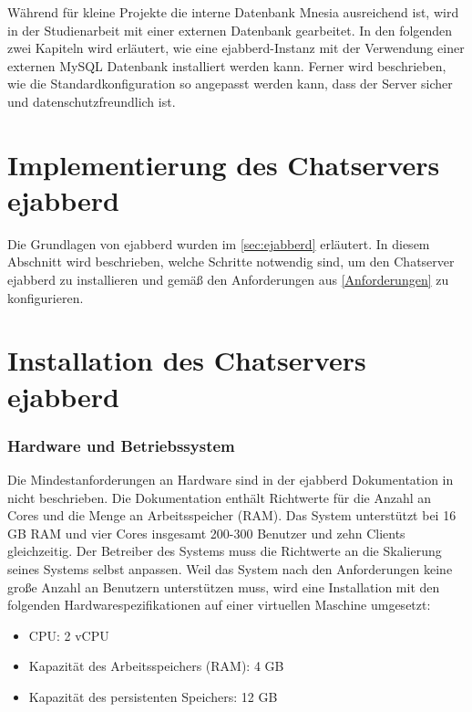 \documentclass[a4paper,titlepage,halfparskip,12pt]{scrreprt}
\begin{document}
\begin{onehalfspacing}
Während für kleine Projekte die interne Datenbank Mnesia ausreichend ist, wird in der Studienarbeit mit einer externen Datenbank gearbeitet. In den folgenden zwei Kapiteln wird erläutert, wie eine ejabberd-Instanz mit der Verwendung einer externen MySQL Datenbank installiert werden kann. Ferner wird beschrieben, wie die Standardkonfiguration so angepasst werden kann, dass der Server sicher und datenschutzfreundlich ist.

\pagebreak

\section{Implementierung des Chatservers ejabberd}
\label{sec:ChatserverEntwicklung}

Die Grundlagen von ejabberd wurden im \autoref{sec:ejabberd} erläutert. In diesem Abschnitt wird beschrieben, welche Schritte notwendig sind, um den Chatserver ejabberd zu installieren und gemäß den Anforderungen aus \autoref{Anforderungen} zu konfigurieren.

\section{Installation des Chatservers ejabberd}
\label{sec:InstallationEjabberd}

\subsubsection*{Hardware und Betriebssystem}

Die Mindestanforderungen an Hardware sind in der ejabberd Dokumentation in \cite{ejabberdDocGettingStarted} nicht beschrieben. Die Dokumentation enthält Richtwerte für die Anzahl an Cores und die Menge an Arbeitsspeicher (RAM). Das System unterstützt bei 16 GB RAM und vier Cores insgesamt 200-300 Benutzer und zehn Clients gleichzeitig. Der Betreiber des Systems muss die Richtwerte an die Skalierung seines Systems selbst anpassen. Weil das System nach den Anforderungen keine große Anzahl an Benutzern unterstützen muss, wird eine Installation mit den folgenden Hardwarespezifikationen auf einer virtuellen Maschine umgesetzt:

\begin{itemize}
\item CPU: 2 vCPU
\item Kapazität des Arbeitsspeichers (RAM): 4 GB
\item Kapazität des persistenten Speichers: 12 GB
\end{itemize}


\end{onehalfspacing}
\end{document}
